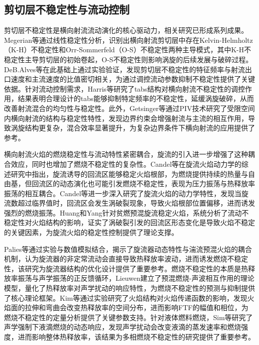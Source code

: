 \subsection{剪切层不稳定性与流动控制}

剪切层不稳定性是横向射流流动演化的核心驱动力，相关研究已形成系列成果。Megerian等\cite{megerian2007}通过线性稳定性分析，识别出横向射流剪切层中存在Kelvin-Helmholtz（K-H）不稳定性和Orr-Sommerfeld（O-S）不稳定性两种主导模式，其中K-H不稳定性主导剪切层的初始卷起，O-S不稳定性则影响涡旋的后续发展与破碎过程。DeB.Alves等\cite{alves2008}在此基础上通过实验验证，发现剪切层不稳定性的特征频率与射流出口速度和主流速度的比值密切相关，为通过调控流动参数抑制不稳定性提供了关键依据。针对流动控制需求，Harris等\cite{harris2021}研究了tabs结构对横向射流不稳定性的调控作用，结果表明合理设计的tabs能够抑制特定频率的不稳定性，延缓涡旋破碎，从而改善射流混合的均匀性与稳定性。此外，Getsinger等\cite{getsinger2014}通过PIV技术研究了受限空间内横向射流的结构与稳定性特性，发现边界约束会增强射流与主流的相互作用，导致涡旋结构更复杂，混合效率显著提升，为复杂边界条件下横向射流的应用提供了参考。

横向射流火焰的燃烧稳定性与流动特性紧密耦合，旋流的引入进一步增强了这种耦合效应，同时也增加了燃烧不稳定性的复杂性。Candel等\cite{candel2012}在旋流火焰动力学的综述研究中指出，旋流诱导的回流区能够稳定火焰根部，为燃烧提供持续的热量与自由基，但回流区的动态演化也可能引发燃烧不稳定性，表现为压力振荡与热释放率振荡的相互耦合。Candel等\cite{candel2014}进一步深入研究了旋流火焰的动力学特性，发现当旋流数超过临界值时，回流区会发生涡破裂现象，导致火焰根部位置偏移，进而诱发强烈的燃烧振荡。Huang和Yang\cite{huang2009}针对贫燃预混旋流稳定火焰，系统分析了流动不稳定性对火焰结构的影响，证实了涡破裂引发的回流区形态变化是导致火焰不稳定的关键因素，为旋流火焰的稳定性控制提供了理论支撑。

Palies等\cite{palies2010}通过实验与数值模拟结合，揭示了旋流器动态特性与湍流预混火焰的耦合机制，认为旋流器的非定常流动会直接导致热释放率波动，进而诱发燃烧不稳定性，该研究为旋流器结构的优化设计提供了重要参考。燃烧不稳定性的本质是热释放率振荡与声学振荡的正反馈循环，Lieuwen\cite{lieuwen2003}建立了预混燃烧-声波相互作用的理论模型，量化了热释放率对声学扰动的响应特性，为燃烧不稳定性的预测与抑制提供了核心理论框架。Kim等\cite{kim2008}通过实验研究了火焰结构对火焰传递函数的影响，发现火焰面的拉伸和弯曲会改变热释放率的空间分布，进而影响FTF的幅值和相位，为燃烧不稳定性的定量分析提供了关键参数支持。针对液体燃料燃烧，Sim等\cite{sim2020}研究了声学强制下液滴燃烧的动态响应，发现声学扰动会改变液滴的蒸发速率和燃烧强度，进而影响整体热释放率，该结果为多相燃烧不稳定性的研究提供了重要参考。

